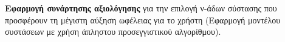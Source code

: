 {\textbf {Εφαρμογή συνάρτησης αξιολόγησης}} για την επιλογή ν-άδων σύστασης που 
προσφέρουν τη μέγιστη αύξηση ωφέλειας για το χρήστη (Εφαρμογή 
{} μοντέλου συστάσεων με χρήση άπληστου προσεγγιστικού αλγορίθμου).

\begin{comment}
{\textbf {Πολυεπίπεδες υβριδικές συστάσεις}}
Το προφίλ ομάδων χρηστών χωρίζονται σε σημασιολογικούς τομείς. Καθένας από τους
τομείς αντιστοιχεί σε μια ομάδα και αντιπροσωπεύει ένα υποσύνολο των προτιμήσεων
του χρήστη που μοιράζεται με τους χρήστες που συμμετείχαν στη διαδικασία
δημιουργίας των ομάδων. Με την εισαγωγή επιπλέον δομής στα προφίλ των χρηστών
είναι δυνατό να οριστούν σχέσεις μεταξύ των χρηστών σε διαφορετικά επίπεδα,
δημιουργώντας με αυτό τον τρόπο πολύ-επίπεδες κοινότητες ενδιαφερόντων.
\end{comment}
